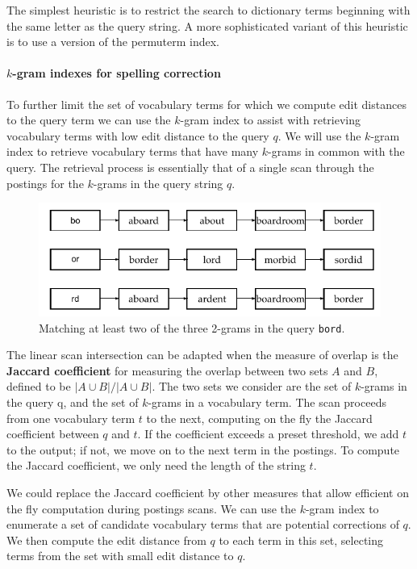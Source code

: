 \documentclass[letterpaper,11pt]{article}
\newcommand{\code}[1]{\texttt{#1}}
\begin{document}
The simplest heuristic is to restrict the search to dictionary terms beginning with the same letter as the query string. A more sophisticated variant of this heuristic is to use a version of the permuterm index.

\paragraph{$k$-gram indexes for spelling correction}
To further limit the set of vocabulary terms for which we compute edit distances to the query term we can use the $k$-gram index to assist with retrieving vocabulary terms with low edit distance to the query $q$. We will use the $k$-gram index to retrieve vocabulary terms that have many $k$-grams in common with the query. The retrieval process is essentially that of a single scan through the postings for the $k$-grams in the query string $q$.
\begin{figure}[H]
    \centering
    \includegraphics[scale=0.70]{sect3/figure_3_7.png}
    \caption{Matching at least two of the three 2-grams in the query \code{bord}.}
\end{figure}

The linear scan intersection can be adapted when the measure of overlap is the \textbf{Jaccard coefficient} for measuring the overlap between two sets $A$ and $B$, defined to be $|A \cup B|/|A \cup B|$. The two sets we consider are the set of $k$-grams in the query q, and the set of $k$-grams in a vocabulary term. The scan proceeds from one vocabulary term $t$ to the next, computing on the fly the Jaccard coefficient between $q$ and $t$. If the coefficient exceeds a preset threshold, we add $t$ to the output; if not, we move on to the next term in the postings. To compute the Jaccard coefficient, we only need the length of the string $t$.

We could replace the Jaccard coefficient by other measures that allow efficient on the fly computation during postings scans. We can use the $k$-gram index to enumerate a set of candidate vocabulary terms that are potential corrections of $q$. We then compute the edit distance from $q$ to each term in this set, selecting terms from the set with small edit distance to $q$.
\end{document}
